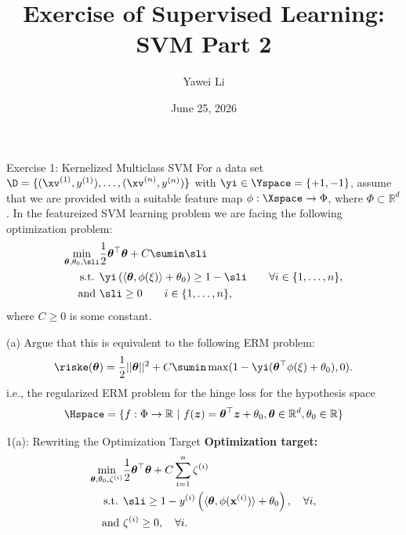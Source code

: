 \documentclass[aspectratio=169]{beamer}
\title[]{\textbf{Exercise of Supervised Learning: \\ SVM Part 2}}
\author{Yawei Li}
\institute[LMU]
{
\\
  \texttt{yawei.li@stat.uni-muenchen.de}
}
\date{June 25, 2026}
\newcommand{\zv}{\bm{z}}
\newcommand{\thetab}{\bm{\theta}}
\renewcommand{\phixi}{\phi(\xi)}
\begin{document}
\begin{frame}
\titlepage
\end{frame}

\begin{frame}{Exercise 1: Kernelized Multiclass SVM}
	\small
	For a data set $\D = \{(\xv^{(1)}, y^{(1)}), \ldots, (\xv^{(n)}, y^{(n)}) \}$ with $\yi \in \Yspace = \{+1, -1 \}$, assume that we are provided with a suitable feature map $\phi: \Xspace \to \Phi$, where $\Phi \subset \mathbb{R}^d$. In the featureized SVM learning problem we are facing the following optimization problem:
	\begin{align*}
		\min_{\thetab, \theta_0, \sli} &\frac{1}{2} \thetab^\top \thetab + C \sumin \sli \\
		\text{s.t. } & \yi \left(\left\langle \thetab, \phixi \right\rangle  + \theta_0\right) \geq 1 - \sli \qquad \forall i \in \{1, \ldots, n \}, \\
		\text{and } & \sli \geq 0 \qquad i \in \{1, \ldots, n \},
	\end{align*}
	where $C \geq 0$ is some constant.
	
	(a) Argue that this is equivalent to the following ERM problem:
		\begin{align*}
			\riske(\thetab) = \frac{1}{2} ||\thetab||^2 + C\sumin \max(1 - \yi(\thetab^\top \phixi + \theta_0), 0).
		\end{align*}
		i.e., the regularized ERM problem for the hinge loss for the hypothesis space 
		\begin{align*}
			\Hspace = \{f: \Phi \to \mathbb{R} \ | \ f(\zv) = \thetab^\top \zv + \theta_0, \thetab \in \mathbb{R}^d, \theta_0 \in \mathbb{R} \}
		\end{align*}
\end{frame}

\begin{frame}{1(a): Rewriting the Optimization Target}
	\textbf{Optimization target:}
	\begin{align*}
	    \min_{\thetab, \theta_0, \zeta^{(i)}} &\frac{1}{2} \thetab^\top \thetab + C \sum_{i=1}^n \zeta^{(i)} \\
	    \text{s.t. } & \sli \geq 1 - y^{(i)} \left(\langle \thetab, \phi(\mathbf{x}^{(i)}) \rangle + \theta_0 \right), \quad \forall i, \\
	    \text{and } & \zeta^{(i)} \geq 0, \quad \forall i.
	\end{align*}
	
\end{frame}
\end{document}
